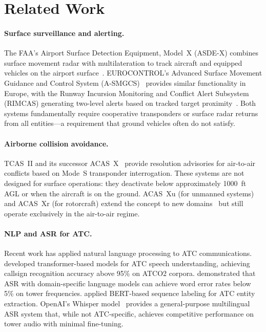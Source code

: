 \documentclass[11pt,a4paper]{article}
\begin{document}
\section{Related Work}
\label{sec:related}

\paragraph{Surface surveillance and alerting.}
The FAA's Airport Surface Detection Equipment, Model~X (ASDE-X) combines surface movement radar with multilateration to track aircraft and equipped vehicles on the airport surface~\citep{faa2020asdex}.
EUROCONTROL's Advanced Surface Movement Guidance and Control System (A-SMGCS)~\citep{eurocontrol2004asmgcs} provides similar functionality in Europe, with the Runway Incursion Monitoring and Conflict Alert Subsystem (RIMCAS) generating two-level alerts based on tracked target proximity~\citep{eurocontrol2010rimcas}.
Both systems fundamentally require cooperative transponders or surface radar returns from all entities---a requirement that ground vehicles often do not satisfy.

\paragraph{Airborne collision avoidance.}
TCAS~II and its successor ACAS~X~\citep{kuchar2007tcas,holland2013acasx} provide resolution advisories for air-to-air conflicts based on Mode~S transponder interrogation.
These systems are not designed for surface operations: they deactivate below approximately 1000~ft AGL or when the aircraft is on the ground.
ACAS~Xu (for unmanned systems) and ACAS~Xr (for rotorcraft) extend the concept to new domains~\citep{manfredi2024acasxu} but still operate exclusively in the air-to-air regime.

\paragraph{NLP and ASR for ATC.}
Recent work has applied natural language processing to ATC communications.
\citet{zuluaga2023atcnlp} developed transformer-based models for ATC speech understanding, achieving callsign recognition accuracy above 95\% on ATCO2 corpora.
\citet{helmke2021atcasr} demonstrated that ASR with domain-specific language models can achieve word error rates below 5\% on tower frequencies.
\citet{pellegrini2019atcbert} applied BERT-based sequence labeling for ATC entity extraction.
OpenAI's Whisper model~\citep{radford2023whisper} provides a general-purpose multilingual ASR system that, while not ATC-specific, achieves competitive performance on tower audio with minimal fine-tuning.
\end{document}
